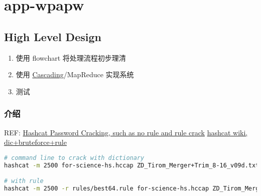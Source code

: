 %

\chapter{app-wpapw}

\section{High Level Design}



\begin{enumerate}
  \item 使用 flowchart 将处理流程初步理清
  \item 使用 \href{http://www.cascading.org/}{Cascading}/MapReduce 实现系统
  \item 测试
\end{enumerate}


\subsection{介绍}


REF:
\href{https://suprafortix.wordpress.com/tag/rockyou-txt/}{Hashcat Password Cracking, such as no rule and rule crack}
\href{https://hashcat.net/wiki/doku.php?id=cracking_wpawpa2}{hashcat wiki, dic+bruteforce+rule}


\begin{lstlisting}[language=bash]
# command line to crack with dictionary
hashcat -m 2500 for-science-hs.hccap ZD_Tirom_Merger+Trim_8-16_v09d.txt

# with rule
hashcat -m 2500 -r rules/best64.rule for-science-hs.hccap ZD_Tirom_Merger+Trim_8-16_v09d.txt
\end{lstlisting}



